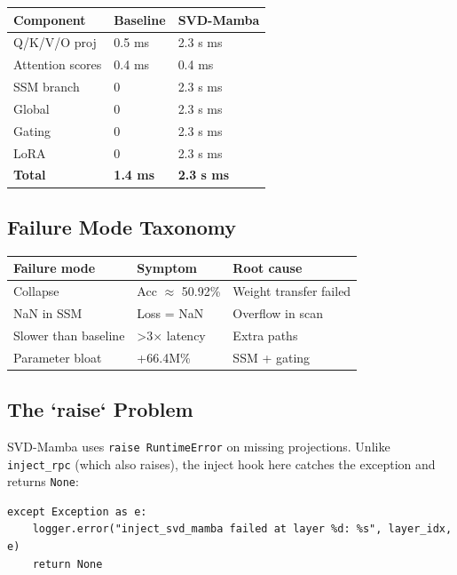 \begin{table}[H]
\centering
\small
\begin{tabular}{lll}
\toprule
\textbf{Component} & \textbf{Baseline} & \textbf{SVD-Mamba} \\
\midrule
Q/K/V/O proj & 0.5 ms & 2.3 s ms \\
Attention scores & 0.4 ms & 0.4 ms \\
SSM branch & 0 & 2.3 s ms \\
Global & 0 & 2.3 s ms \\
Gating & 0 & 2.3 s ms \\
LoRA & 0 & 2.3 s ms \\
\textbf{Total} & \textbf{1.4 ms} & \textbf{2.3 s ms} \\
\bottomrule
\end{tabular}
\end{table}

\subsection{Failure Mode Taxonomy}

\begin{table}[H]
\centering
\small
\begin{tabular}{lll}
\toprule
\textbf{Failure mode} & \textbf{Symptom} & \textbf{Root cause} \\
\midrule
Collapse & Acc $\approx$ 50.92\% & Weight transfer failed \\
NaN in SSM & Loss = NaN & Overflow in scan \\
Slower than baseline & >3$\times$ latency & Extra paths \\
Parameter bloat & +66.4M\% & SSM + gating \\
\bottomrule
\end{tabular}
\end{table}

\subsection{The `raise` Problem}

SVD-Mamba uses \texttt{raise RuntimeError} on missing projections. Unlike 
\texttt{inject\_rpc} (which also raises), the inject hook here catches the 
exception and returns \texttt{None}:

\begin{lstlisting}
except Exception as e:
    logger.error("inject_svd_mamba failed at layer %d: %s", layer_idx, e)
    return None
\end{lstlisting}

